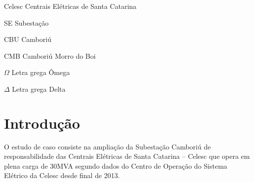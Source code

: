 \documentclass[a5paper,english,spanish,brazil]{ufsc-thesis}
\begin{document}
	\begin{siglas}
	  \item[Celesc] Centrais Elétricas de Santa Catarina
	  \item[SE] Subestação
	  \item[CBU] Camboriú
	  \item[CMB] Camboriú Morro do Boi
	\end{siglas}

	\begin{simbolos}
	  \item[$ \Omega $] Letra grega Ômega
	  \item[$ \Delta $] Letra grega Delta
	\end{simbolos}

	\tableofcontents*
	\cleardoublepage


\textual %

\chapter[Introdução]{Introdução} %
	O estudo de caso consiste na ampliação da Subestação Camboriú de responsabilidade das Centrais Elétricas de Santa Catarina – Celesc que opera em plena carga de 30MVA segundo dados do Centro de Operação do Sistema Elétrico da Celesc desde final de 2013.
\end{document}
